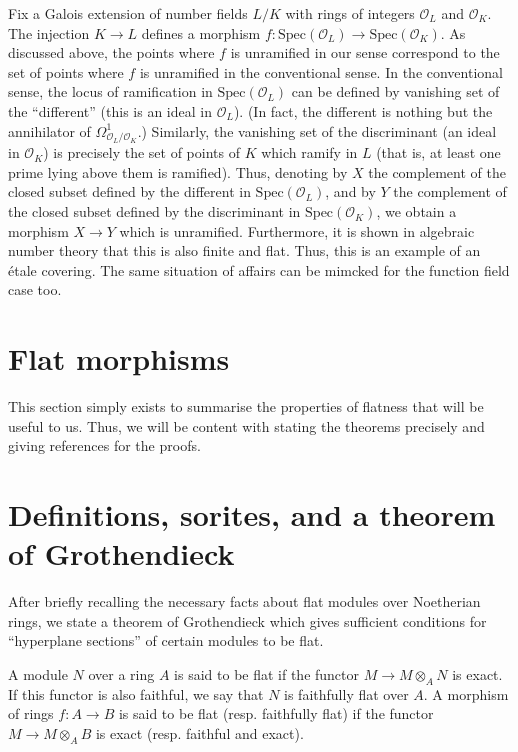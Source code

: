 \begin{example}
\label{example-number-theory-etale}
Fix a Galois extension of number fields $L/K$ with rings of integers 
$\mathcal{O}_L$
and $\mathcal{O}_K$. The injection $K \to L$ defines a morphism
$f:\text{Spec}(\mathcal{O}_L) \to \text{Spec}(\mathcal{O}_K)$. As discussed 
above, the points where $f$
is unramified in our sense correspond to the set of points where $f$ is
unramified in the conventional sense. In the conventional sense, the locus of
ramification in $\text{Spec}(\mathcal{O}_L)$ can be defined by vanishing set of 
the
``different'' (this is an ideal in $\mathcal{O}_L$). (In fact, the different is
nothing but the annihilator of $\Omega^1_{\mathcal{O}_L/\mathcal{O}_K}$.) 
Similarly, the
vanishing set of the discriminant (an ideal in $\mathcal{O}_K$) is precisely 
the set
of points of $K$ which ramify in $L$ (that is, at least one prime lying above
them is ramified). Thus, denoting by $X$ the complement of the closed subset
defined by the different in $\text{Spec}(\mathcal{O}_L)$, and by $Y$ the 
complement of the
closed subset defined by the discriminant in $\text{Spec}(\mathcal{O}_K)$, we 
obtain a
morphism $X \to Y$ which is unramified. Furthermore, it is shown in algebraic
number theory that this is also finite and flat. Thus, this is an example of
an \'etale covering. The same situation of affairs can be mimcked for the
function field case too.
\end{example}

\section{Flat morphisms}
\label{section-flat-moprhisms}

\noindent
This section simply exists to summarise the properties of flatness that will
be useful to us. Thus, we will be content with stating the theorems precisely
and giving references for the proofs.

\section{Definitions, sorites, and a theorem of Grothendieck}
\label{section-definition-flat}

\noindent
After briefly recalling the necessary facts about flat modules over Noetherian
rings, we state a theorem of Grothendieck which gives sufficient conditions
for ``hyperplane sections'' of certain modules to be flat.

\begin{definition}
\label{definition-flat-rings}
A module $N$ over a ring $A$ is said to be flat if the functor
$M \to M \otimes_A N$ is exact. If this functor is also faithful, we say that
$N$ is faithfully flat over $A$. A morphism of rings $f:A \to B$ is said to be
flat (resp. faithfully flat) if the functor $M \to M \otimes_A B$ is exact
(resp. faithful and exact). 
\end{definition}

